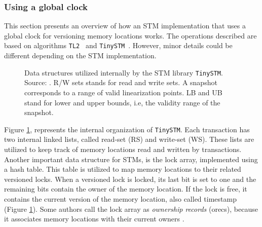 \subsubsection{Using a global clock}

This section presents an overview of how an STM implementation that uses a global clock for versioning memory locations works. The operations described are based on algorithms \texttt{TL2}~\cite{TL2} and \texttt{TinySTM}~\cite{TinySTM2}. However, minor details could be different depending on the STM implementation.

\begin{figure}[ht]
	\centering
	\caption{Data structures utilized internally by the STM library \texttt{TinySTM}. Source: \cite{TinySTM2}. R/W sets stands for read and write sets. A snapshot corresponds to a range of valid linearization points. LB and UB stand for lower and upper bounds, i.e, the validity range of the snapshot.}
 	\label{fig:TinySTMDataStructs}
\end{figure} 

Figure \ref{fig:TinySTMDataStructs}, represents the internal organization of \texttt{TinySTM}. Each transaction has two internal linked lists, called read-set (RS) and write-set (WS). These lists are utilized to keep track of memory locations read and written by transactions. Another important data structure for STMs, is the lock array, implemented using a hash table. This table is utilized to map memory locations to their related versioned locks. When a versioned lock is locked, its last bit is set to one and the remaining bits contain the owner of the memory location. If the lock is free, it contains the current version of the memory location, also called timestamp (Figure \ref{fig:TinySTMDataStructs}). Some authors call the lock array as \emph{ownership records} (orecs), because it associates memory locations with their current owners \cite{NOrec}.

